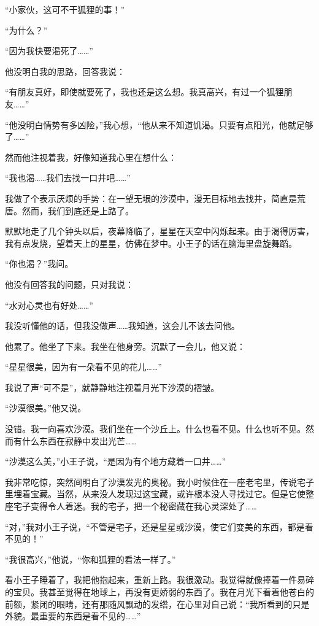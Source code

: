 “小家伙，这可不干狐狸的事！”

“为什么？”

“因为我快要渴死了\ldots{}\ldots{}”

他没明白我的思路，回答我说：

“有朋友真好，即使就要死了，我也还是这么想。我真高兴，有过一个狐狸朋友\ldots{}\ldots{}”

“他没明白情势有多凶险，”我心想，“他从来不知道饥渴。只要有点阳光，他就足够了\ldots{}\ldots{}”

然而他注视着我，好像知道我心里在想什么：

“我也渴\ldots{}\ldots{}我们去找一口井吧\ldots{}\ldots{}”

我做了个表示厌烦的手势：在一望无垠的沙漠中，漫无目标地去找井，简直是荒唐。然而，我们到底还是上路了。

默默地走了几个钟头以后，夜幕降临了，星星在天空中闪烁起来。由于渴得厉害，我有点发烧，望着天上的星星，仿佛在梦中。小王子的话在脑海里盘旋舞蹈。

“你也渴？”我问。

他没有回答我的问题，只对我说：

“水对心灵也有好处\ldots{}\ldots{}”

我没听懂他的话，但我没做声\ldots{}\ldots{}我知道，这会儿不该去问他。

他累了。他坐了下来。我坐在他身旁。沉默了一会儿，他又说：

“星星很美，因为有一朵看不见的花儿\ldots{}\ldots{}”

我说了声“可不是”，就静静地注视着月光下沙漠的褶皱。

“沙漠很美。”他又说。

没错。我一向喜欢沙漠。我们坐在一个沙丘上。什么也看不见。什么也听不见。然而有什么东西在寂静中发出光芒\ldots{}\ldots{}

“沙漠这么美，”小王子说，“是因为有个地方藏着一口井\ldots{}\ldots{}”

我非常吃惊，突然间明白了沙漠发光的奥秘。我小时候住在一座老宅里，传说宅子里埋着宝藏。当然，从来没人发现过这宝藏，或许根本没人寻找过它。但是它使整座宅子变得令人着迷。我的宅子，把一个秘密藏在我心灵深处了\ldots{}\ldots{}

“对，”我对小王子说，“不管是宅子，还是星星或沙漠，使它们变美的东西，都是看不见的！”

“我很高兴，”他说，“你和狐狸的看法一样了。”

看小王子睡着了，我把他抱起来，重新上路。我很激动。我觉得就像捧着一件易碎的宝贝。我甚至觉得在地球上，再没有更娇弱的东西了。我在月光下看着他苍白的前额，紧闭的眼睛，还有那随风飘动的发绺，在心里对自己说：“我所看到的只是外貌。最重要的东西是看不见的\ldots{}\ldots{}”


